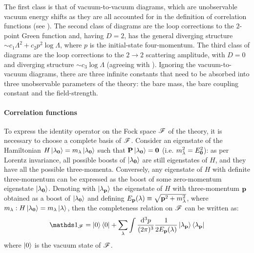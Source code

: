 The first class is that of vacuum-to-vacuum diagrams, which are unobservable vacuum energy shifts as they are all accounted for in the definition of correlation functions (see ).
The second class of diagrams are the loop corrections to the $ 2 $-point Green function and, having $ D = 2 $, has the general diverging structure $ \sim c_1 \Lambda^2 + c_2 p^2 \log \Lambda $, where $ p $ is the initial-state four-momentum.
The third class of diagrams are the loop corrections to the $ 2 \rightarrow 2 $ scattering amplitude, with $ D = 0 $ and diverging structure $ \sim c_3 \log \Lambda $ (agreeing with ).
Ignoring the vacuum-to-vacuum diagrams, there are three infinite constants that need to be absorbed into three unobservable parameters of the theory: the bare mass, the bare coupling constant and the field-strength.

\paragraph{Correlation functions}

To express the identity operator on the Fock space $ \mathscr{F} $ of the theory, it is necessary to choose a complete basis of $ \mathscr{F} $. Consider an eigenstate of the Hamiltonian $ H \ket{\lambda_{\mathbf{0}}} = m_\lambda \ket{\lambda_{\mathbf{0}}} $ such that $ \mathbf{P} \ket{\lambda_{\mathbf{0}}} = \mathbf{0} $ (i.e. $ m_\lambda^2 = E_{\mathbf{0}}^2 $): as per Lorentz invariance, all possible boosts of $ \ket{\lambda_{\mathbf{0}}} $ are still eigenstates of $ H $, and they have all the possible three-momenta. Conversely, any eigenstate of $ H $ with definite three-momentum can be expressed as the boost of some zero-momentum eigenstate $ \ket{\lambda_{\mathbf{0}}} $. Denoting with $ \ket{\lambda_{\mathbf{p}}} $ the eigenstate of $ H $ with three-momentum $ \mathbf{p} $ obtained as a boost of $ \ket{\lambda_{\mathbf{0}}} $ and defining $ E_{\mathbf{p}}(\lambda) \equiv \sqrt{\mathbf{p}^2 + m_\lambda^2} $, where $ m_\lambda : H \ket{\lambda_{\mathbf{0}}} = m_\lambda \ket{\lambda} $, then the completeness relation on $ \mathscr{F} $ can be written as\footnotemark:
\begin{equation}
  \id_\fock = \ket{0}\bra{0} + \sum_\lambda \int \frac{\dd^3p}{(2\pi)^3} \frac{1}{2E_\ve{p}(\lambda)} \ket{\lambda_\ve{p}}\bra{\lambda_\ve{p}}
\end{equation}
where $ \ket{0} $ is the vacuum state of $ \mathscr{F} $.


